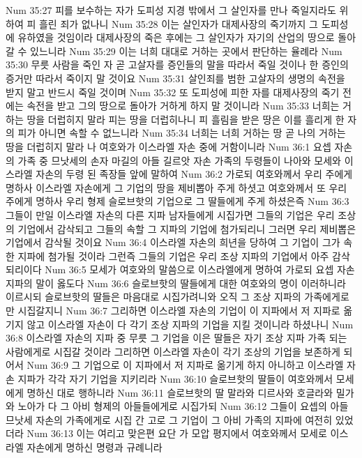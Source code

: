 Num 35:27  피를 보수하는 자가 도피성 지경 밖에서 그 살인자를 만나 죽일지라도 위하여 피 흘린 죄가 없나니
Num 35:28  이는 살인자가 대제사장의 죽기까지 그 도피성에 유하였을 것임이라 대제사장의 죽은 후에는 그 살인자가 자기의 산업의 땅으로 돌아갈 수 있느니라
Num 35:29  이는 너희 대대로 거하는 곳에서 판단하는 율례라
Num 35:30  무릇 사람을 죽인 자 곧 고살자를 증인들의 말을 따라서 죽일 것이나 한 증인의 증거만 따라서 죽이지 말 것이요
Num 35:31  살인죄를 범한 고살자의 생명의 속전을 받지 말고 반드시 죽일 것이며
Num 35:32  또 도피성에 피한 자를 대제사장의 죽기 전에는 속전을 받고 그의 땅으로 돌아가 거하게 하지 말 것이니라
Num 35:33  너희는 거하는 땅을 더럽히지 말라 피는 땅을 더럽히나니 피 흘림을 받은 땅은 이를 흘리게 한 자의 피가 아니면 속할 수 없느니라
Num 35:34  너희는 너희 거하는 땅 곧 나의 거하는 땅을 더럽히지 말라 나 여호와가 이스라엘 자손 중에 거함이니라
Num 36:1  요셉 자손의 가족 중 므낫세의 손자 마길의 아들 길르앗 자손 가족의 두령들이 나아와 모세와 이스라엘 자손의 두령 된 족장들 앞에 말하여
Num 36:2  가로되 여호와께서 우리 주에게 명하사 이스라엘 자손에게 그 기업의 땅을 제비뽑아 주게 하셧고 여호와께서 또 우리 주에게 명하사 우리 형제 슬로브핫의 기업으로 그 딸들에게 주게 하셨은즉
Num 36:3  그들이 만일 이스라엘 자손의 다른 지파 남자들에게 시집가면 그들의 기업은 우리 조상의 기업에서 감삭되고 그들의 속할 그 지파의 기업에 첨가되리니 그러면 우리 제비뽑은 기업에서 감삭될 것이요
Num 36:4  이스라엘 자손의 희년을 당하여 그 기업이 그가 속한 지파에 첨가될 것이라 그런즉 그들의 기업은 우리 조상 지파의 기업에서 아주 감삭되리이다
Num 36:5  모세가 여호와의 말씀으로 이스라엘에게 명하여 가로되 요셉 자손 지파의 말이 옳도다
Num 36:6  슬로브핫의 딸들에게 대한 여호와의 명이 이러하니라 이르시되 슬로브핫의 딸들은 마음대로 시집가려니와 오직 그 조상 지파의 가족에게로만 시집갈지니
Num 36:7  그리하면 이스라엘 자손의 기업이 이 지파에서 저 지파로 옮기지 않고 이스라엘 자손이 다 각기 조상 지파의 기업을 지킬 것이니라 하셨나니
Num 36:8  이스라엘 자손의 지파 중 무릇 그 기업을 이은 딸들은 자기 조상 지파 가족 되는 사람에게로 시집갈 것이라 그리하면 이스라엘 자손이 각기 조상의 기업을 보존하게 되어서
Num 36:9  그 기업으로 이 지파에서 저 지파로 옮기게 하지 아니하고 이스라엘 자손 지파가 각각 자기 기업을 지키리라
Num 36:10  슬로브핫의 딸들이 여호와께서 모세에게 명하신 대로 행하니라
Num 36:11  슬로브핫의 딸 말라와 디르사와 호글라와 밀가와 노아가 다 그 아비 형제의 아들들에게로 시집가되
Num 36:12  그들이 요셉의 아들 므낫세 자손의 가족에게로 시집 간 고로 그 기업이 그 아비 가족의 지파에 여전히 있었더라
Num 36:13  이는 여리고 맞은편 요단 가 모압 평지에서 여호와께서 모세로 이스라엘 자손에게 명하신 명령과 규례니라


